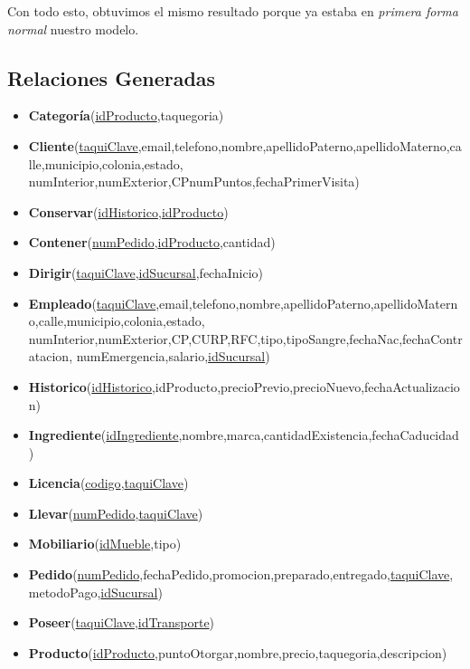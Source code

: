 \documentclass[11pt,letterpaper]{article}
\begin{document}
Con todo esto, obtuvimos el mismo resultado porque ya estaba en \textit{primera forma normal} nuestro modelo.

\subsection{Relaciones Generadas}
\begin{itemize}
\item \footnotesize{\textbf{Categoría}(\underline{idProducto},taquegoria)}
\item \footnotesize{\textbf{Cliente}(\underline{taquiClave},email,telefono,nombre,apellidoPaterno,apellidoMaterno,calle,municipio,colonia,estado,
numInterior,numExterior,CPnumPuntos,fechaPrimerVisita)}
\item \footnotesize{\textbf{Conservar}(\underline{idHistorico},\underline{idProducto})}
\item \footnotesize{\textbf{Contener}(\underline{numPedido},\underline{idProducto},cantidad)}
\item \footnotesize{\textbf{Dirigir}(\underline{taquiClave},\underline{idSucursal},fechaInicio)}
\item \footnotesize{\textbf{Empleado}(\underline{taquiClave},email,telefono,nombre,apellidoPaterno,apellidoMaterno,calle,municipio,colonia,estado,
numInterior,numExterior,CP,CURP,RFC,tipo,tipoSangre,fechaNac,fechaContratacion,
numEmergencia,salario,\underline{idSucursal})}
\item \footnotesize{\textbf{Historico}(\underline{idHistorico},idProducto,precioPrevio,precioNuevo,fechaActualizacion)}
\item \footnotesize{\textbf{Ingrediente}(\underline{idIngrediente},nombre,marca,cantidadExistencia,fechaCaducidad)}
\item \footnotesize{\textbf{Licencia}(\underline{codigo},\underline{taquiClave}})
\item \footnotesize{\textbf{Llevar}(\underline{numPedido},\underline{taquiClave})}
\item \footnotesize{\textbf{Mobiliario}(\underline{idMueble},tipo)}
\item \footnotesize{\textbf{Pedido}(\underline{numPedido},fechaPedido,promocion,preparado,entregado,\underline{taquiClave},metodoPago,\underline{idSucursal})}
\item \footnotesize{\textbf{Poseer}(\underline{taquiClave},\underline{idTransporte})}
\item \footnotesize{\textbf{Producto}(\underline{idProducto},puntoOtorgar,nombre,precio,taquegoria,descripcion)}

\end{itemize}
\end{document}
